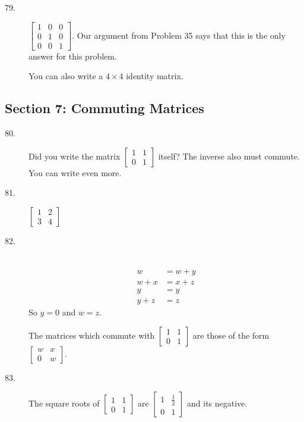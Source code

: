 \documentclass{article}
\begin{document}
\begin{description}
  \item[79.] $\begin{bmatrix} 1 & 0 & 0 \\ 0 & 1 & 0 \\ 0 & 0 & 1 \end{bmatrix}$. Our argument from Problem 35 says that this is the only answer for this problem.

    You can also write a $4 \times 4$ identity matrix.

\end{description}


\subsection*{Section 7: Commuting Matrices}

\begin{description}

  \item[80.] Did you write the matrix $\begin{bmatrix} 1 & 1 \\ 0 & 1 \end{bmatrix}$ itself? The inverse also must commute. You can write even more.

  \item[81.] $\begin{bmatrix} 1 & 2 \\ 3 & 4 \end{bmatrix}$

  \item[82.] $\ $
    \begin{align*}
        w & = w + y \\
    w + x & = x + z \\ 
        y & = y \\
    y + z & = z
    \end{align*}
    So $y = 0$ and $w = z$.

    The matrices which commute with $\begin{bmatrix} 1 & 1 \\ 0 & 1 \end{bmatrix}$ are those of the form $\begin{bmatrix} w & x \\ 0 & w \end{bmatrix}$.

  \item[83.] The square roots of $\begin{bmatrix} 1 & 1 \\ 0 & 1 \end{bmatrix}$ are $\begin{bmatrix} 1 & \frac{1}{2} \\ 0 & 1 \end{bmatrix}$ and its negative.


\end{description}
\end{document}

